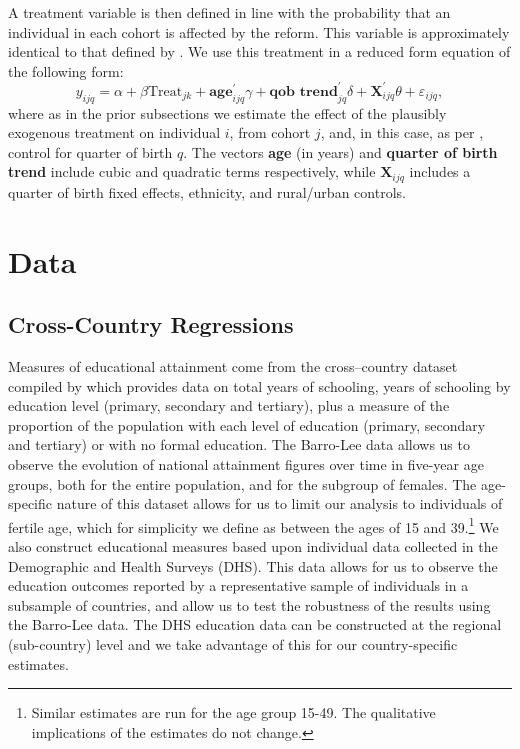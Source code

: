 \documentclass{article}[12pt,subeqn]
\begin{document}
\begin{spacing}{1.4}
A treatment variable is then defined in line with the probability that an 
individual in each cohort is affected by the reform.  This variable is 
approximately identical to that defined by \citet{Chicoine2011}.  We use this 
treatment in a reduced form equation of the following form:
\begin{equation}
\label{eqn:Kenya}
     y_{ijq}=\alpha+\beta\text{Treat}_{jk}+\textbf{age}_{ijq}^\prime\gamma+
     \textbf{qob trend}_{jq}^\prime \delta +\textbf{X}^\prime_{ijq}\theta+
     \varepsilon_{ijq},
\end{equation}
where as in the prior subsections we estimate the effect of the plausibly 
exogenous treatment on individual $i$, from cohort $j$, and, in this case, as per 
\citet{Chicoine2011}, control for quarter of birth $q$.  The vectors \textbf{age} 
(in years) and \textbf{quarter of birth trend} include cubic and quadratic terms 
respectively, while $\mathbf{X}_{ijq}$ includes a quarter of birth fixed effects, 
ethnicity, and rural/urban controls.

\section{Data}
\label{scn:data}
\subsection{Cross-Country Regressions}
\label{sscn:datacross}

Measures of educational attainment come from the cross--country dataset compiled 
by \citet{BarroLee2013, BarroLee2010} which provides data on total years of 
schooling, years of schooling by education level (primary, secondary and 
tertiary), plus a measure of the proportion of the population with each level of 
education (primary, secondary and tertiary) or with no formal education.  The 
Barro-Lee data allows us to observe the evolution of national attainment figures 
over time in five-year age groups, both for the entire population, and for the 
subgroup of females. The age-specific nature of this dataset allows for us to 
limit our analysis to individuals of fertile age, which for simplicity we define 
as between the ages of 15 and 39.\footnote{Similar estimates are run for the age 
group 15-49. The qualitative implications of the estimates do not change.} We 
also construct educational measures based upon individual data collected in the 
Demographic and Health Surveys (DHS).  This data allows for us to observe the 
education outcomes reported by a representative sample of individuals in a 
subsample of countries, and allow us to test the robustness of the results using 
the Barro-Lee data. The DHS education data can be constructed at the regional 
(sub-country) level and we take advantage of this for our country-specific 
estimates.


\end{spacing}
\end{document}
